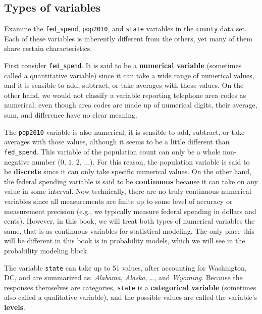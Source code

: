 \documentclass[
  letterpaper,
  DIV=11,
  numbers=noendperiod]{scrreprt}
\begin{document}
\subsection{Types of variables}\label{types-of-variables}

Examine the \texttt{fed\_spend}, \texttt{pop2010}, and \texttt{state}
variables in the \texttt{county} data set. Each of these variables is
inherently different from the others, yet many of them share certain
characteristics.

First consider \texttt{fed\_spend}. It is said to be a \textbf{numerical
variable} (sometimes called a quantitative variable) since it can take a
wide range of numerical values, and it is sensible to add, subtract, or
take averages with those values. On the other hand, we would not
classify a variable reporting telephone area codes as numerical; even
though area codes are made up of numerical digits, their average, sum,
and difference have no clear meaning.

The \texttt{pop2010} variable is also numerical; it is sensible to add,
subtract, or take averages with those values, although it seems to be a
little different than \texttt{fed\_spend}. This variable of the
population count can only be a whole non-negative number (\(0\), \(1\),
\(2\), \(...\)). For this reason, the population variable is said to be
\textbf{discrete} since it can only take specific numerical values. On
the other hand, the federal spending variable is said to be
\textbf{continuous} because it can take on any value in some interval.
Now technically, there are no truly continuous numerical variables since
all measurements are finite up to some level of accuracy or measurement
precision (e.g., we typically measure federal spending in dollars and
cents). However, in this book, we will treat both types of numerical
variables the same, that is as continuous variables for statistical
modeling. The only place this will be different in this book is in
probability models, which we will see in the probability modeling block.

The variable \texttt{state} can take up to 51 values, after accounting
for Washington, DC, and are summarized as: \emph{Alabama},
\emph{Alaska}, \ldots, and \emph{Wyoming}. Because the responses
themselves are categories, \texttt{state} is a \textbf{categorical
variable} (sometimes also called a qualitative variable), and the
possible values are called the variable's \textbf{levels}.
\end{document}
